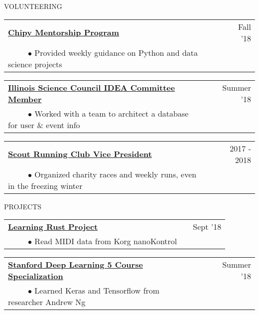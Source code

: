 \documentclass[11pt]{article}
\begin{document}
\vspace{.8cm}


{VOLUNTEERING}
\vspace {0.4cm}

\begin{tabularx}{\linewidth}{l X r}
\textbf{\href{https://chipymentor.org/}{Chipy Mentorship Program}} & & Fall '18 \\
~~~~~$\bullet$ Provided weekly guidance on Python and data science projects\\
\end{tabularx}



\begin{tabularx}{\linewidth}{l X r}
\textbf{\href{http://www.illinoisscience.org/about-2/associates-board/}{Illinois Science Council IDEA Committee Member}} & & Summer '18 \\
~~~~~$\bullet$ Worked with a team to architect a database for user \& event info\\
\end{tabularx}

\begin{tabularx}{\linewidth}{l X r}
\textbf{\href{https://www.facebook.com/TheWeatherMarkRunningClub/}{Scout Running Club Vice President}} & & 2017 - 2018 \\
~~~~~$\bullet$ Organized charity races and weekly runs, even in the freezing winter\\
\end{tabularx}

\vspace {.8cm}


{PROJECTS}
\vspace {0.4cm}

\begin{tabularx}{\linewidth}{l X r}
\textbf{\href{https://github.com/silverdrake11/rustkontrol/blob/master/src/main.rs}{Learning Rust Project}} & & Sept '18 \\
~~~~~$\bullet$ Read MIDI data from Korg nanoKontrol\\
\end{tabularx}


\begin{tabularx}{\linewidth}{l X r}
\textbf{\href{https://www.coursera.org/account/accomplishments/specialization/certificate/DYW5MPE86QH7}{Stanford Deep Learning 5 Course Specialization}} & & Summer '18 \\
~~~~~$\bullet$ Learned Keras and Tensorflow from researcher Andrew Ng\\
\end{tabularx}
\end{document}
